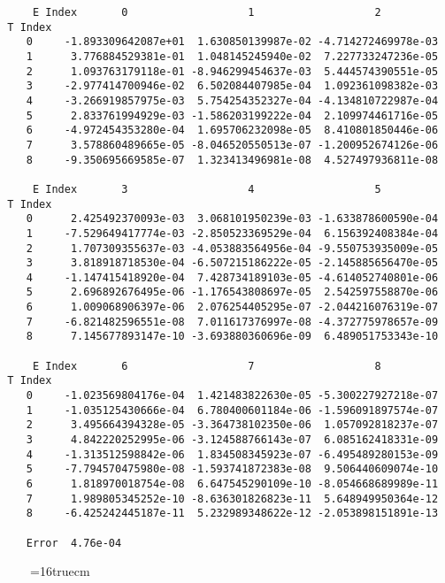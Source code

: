 \documentclass[12pt]{article}
\begin{document}
 
\begin{small}\begin{verbatim} 
      E Index       0                   1                   2
  T Index
     0     -1.893309642087e+01  1.630850139987e-02 -4.714272469978e-03
     1      3.776884529381e-01  1.048145245940e-02  7.227733247236e-05
     2      1.093763179118e-01 -8.946299454637e-03  5.444574390551e-05
     3     -2.977414700946e-02  6.502084407985e-04  1.092361098382e-03
     4     -3.266919857975e-03  5.754254352327e-04 -4.134810722987e-04
     5      2.833761994929e-03 -1.586203199222e-04  2.109974461716e-05
     6     -4.972454353280e-04  1.695706232098e-05  8.410801850446e-06
     7      3.578860489665e-05 -8.046520550513e-07 -1.200952674126e-06
     8     -9.350695669585e-07  1.323413496981e-08  4.527497936811e-08
 
      E Index       3                   4                   5
  T Index
     0      2.425492370093e-03  3.068101950239e-03 -1.633878600590e-04
     1     -7.529649417774e-03 -2.850523369529e-04  6.156392408384e-04
     2      1.707309355637e-03 -4.053883564956e-04 -9.550753935009e-05
     3      3.818918718530e-04 -6.507215186222e-05 -2.145885656470e-05
     4     -1.147415418920e-04  7.428734189103e-05 -4.614052740801e-06
     5      2.696892676495e-06 -1.176543808697e-05  2.542597558870e-06
     6      1.009068906397e-06  2.076254405295e-07 -2.044216076319e-07
     7     -6.821482596551e-08  7.011617376997e-08 -4.372775978657e-09
     8      7.145677893147e-10 -3.693880360696e-09  6.489051753343e-10
 
      E Index       6                   7                   8
  T Index
     0     -1.023569804176e-04  1.421483822630e-05 -5.300227927218e-07
     1     -1.035125430666e-04  6.780400601184e-06 -1.596091897574e-07
     2      3.495664394328e-05 -3.364738102350e-06  1.057092818237e-07
     3      4.842220252995e-06 -3.124588766143e-07  6.085162418331e-09
     4     -1.313512598842e-06  1.834508345923e-07 -6.495489280153e-09
     5     -7.794570475980e-08 -1.593741872383e-08  9.506440609074e-10
     6      1.818970018754e-08  6.647545290109e-10 -8.054668689989e-11
     7      1.989805345252e-10 -8.636301826823e-11  5.648949950364e-12
     8     -6.425242445187e-11  5.232989348622e-12 -2.053898151891e-13
 
     Error  4.76e-04
\end{verbatim}\end{small}

\begin{figure} \label{met.3_3.1.1}
\epsfxsize=16truecm
\end{figure}
\newpage
 
\end{document}
